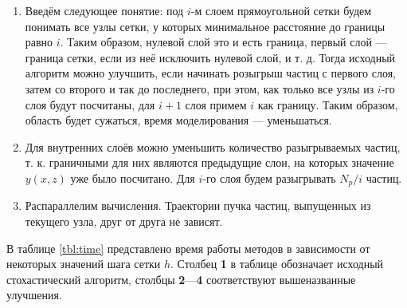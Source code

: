 \documentclass[12pt, a4paper]{article}
\begin{document}
\begin{enumerate}
	\item Введём следующее понятие: под $i$-м слоем прямоугольной сетки будем понимать все узлы сетки, у которых минимальное расстояние до границы равно $i$. Таким образом, нулевой слой это и есть граница, первый слой — граница сетки, если из неё исключить нулевой слой, и т. д.
	Тогда исходный алгоритм можно улучшить, если начинать розыгрыш частиц с первого слоя, затем со второго и так до последнего, при этом, как только все узлы из $i$-го слоя будут посчитаны, для $i+1$ слоя примем $i$ как границу. Таким образом, область будет сужаться, время моделирования — уменьшаться.
	\item Для внутренних слоёв можно уменьшить количество разыгрываемых частиц, т. к. граничными для них являются предыдущие слои, на которых значение $y(x, z)$ уже было посчитано. Для $i$-го слоя будем разыгрывать $N_p / i$ частиц.
	\item Распараллелим вычисления. Траектории пучка частиц, выпущенных из текущего узла, друг от друга не зависят.
\end{enumerate}

В таблице \ref{tbl:time} представлено время работы методов в зависимости от некоторых значений шага сетки $h$.
Столбец \textbf{1} в таблице обозначает исходный стохастический алгоритм, столбцы \textbf{2}—\textbf{4} соответствуют вышеназванные улучшения.
\end{document}
